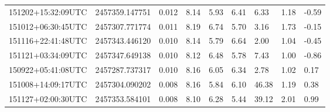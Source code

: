 \begin{table}
\begin{center}
\begin{tabularx}{1.0\textwidth}{lllllllll}
151202+15:32:09UTC & 2457359.147751 &      0.012 & 8.14 & 5.93 & 6.41 & 6.33 & 1.18 & -0.59 \\
151012+06:30:45UTC & 2457307.771774 &      0.011 & 8.19 & 6.74 & 5.70 & 3.16 & 1.73 & -0.15 \\
151116+22:41:48UTC & 2457343.446120 &      0.010 & 8.14 & 5.79 & 6.64 & 2.00 & 1.04 & -0.45 \\
151121+03:34:09UTC & 2457347.649138 &      0.010 & 8.12 & 6.48 & 5.78 & 7.43 & 1.00 & -0.86 \\
150922+05:41:08UTC & 2457287.737317 &      0.010 & 8.16 & 6.05 & 6.34 & 2.78 & 1.02 & 0.17 \\
151008+14:09:17UTC & 2457304.090202 &      0.008 & 8.16 & 5.84 & 6.10 & 46.38 & 1.19 & 0.38 \\
151127+02:00:30UTC & 2457353.584101 &      0.008 & 8.10 & 6.28 & 5.44 & 39.12 & 2.01 & 0.99 \\
\end{tabularx}
  \end{center}
\end{table}

